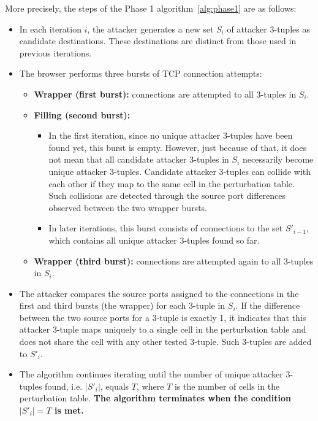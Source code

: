 \documentclass{report}
\begin{document}
More precisely, the steps of the Phase 1 algorithm~\ref{alg:phase1} are as follows:
\begin{itemize}
    \item In each iteration $i$, the attacker generates a new set $S_i$ of attacker 3-tuples as candidate destinations. These destinations are distinct from those used in previous iterations.
    
    \item The browser performs three bursts of TCP connection attempts:
    \begin{itemize}
        \item \textbf{Wrapper (first burst):} connections are attempted to all 3-tuples in $S_i$.
        
        \item \textbf{Filling (second burst):} 
        \begin{itemize}
            \item In the first iteration, since no unique attacker 3-tuples have been found yet, this burst is empty. However, just because of that, it does not mean that all candidate attacker 3-tuples in $S_i$ necessarily become unique attacker 3-tuples. Candidate attacker 3-tuples can collide with each other if they map to the same cell in the perturbation table. Such collisions are detected through the source port differences observed between the two wrapper bursts.
            
            \item In later iterations, this burst consists of connections to the set $S'_{i-1}$, which contains all unique attacker 3-tuples found so far.
        \end{itemize}
        
        \item \textbf{Wrapper (third burst):} connections are attempted again to all 3-tuples in $S_i$.
    \end{itemize}
    
    \item The attacker compares the source ports assigned to the connections in the first and third bursts (the wrapper) for each 3-tuple in $S_i$. If the difference between the two source ports for a 3-tuple is exactly 1, it indicates that this attacker 3-tuple maps uniquely to a single cell in the perturbation table and does not share the cell with any other tested 3-tuple. Such 3-tuples are added to $S'_i$.
    
    \item The algorithm continues iterating until the number of unique attacker 3-tuples found, i.e. $\lvert S'_i \rvert$, equals $T$, where $T$ is the number of cells in the perturbation table. \textbf{The algorithm terminates when the condition $\lvert S'_i \rvert = T$ is met.}
\end{itemize}
\end{document}
